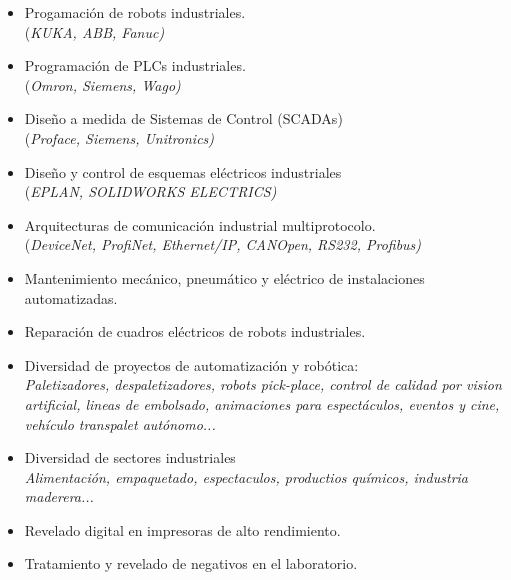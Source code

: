 \documentclass[10pt,a4paper,ragged2e]{altacv}
\begin{document}
\begin{fullwidth}
  \begin{itemize}
    \item Progamación de robots industriales.\\
    (\itshape{KUKA}, \itshape{ABB}, \itshape{Fanuc})
    \item Programación de PLCs industriales.\\
    (\itshape{Omron}, \itshape{Siemens}, \itshape{Wago})
    \item Diseño a medida de Sistemas de Control (SCADAs)\\
    (\itshape{Proface}, \itshape{Siemens}, \itshape{Unitronics})
    \item Diseño y control de esquemas eléctricos industriales\\
    (\itshape{EPLAN}, \itshape{SOLIDWORKS ELECTRICS})
    \item Arquitecturas de comunicación industrial multiprotocolo.\\
    (\itshape{DeviceNet}, \itshape{ProfiNet}, \itshape{Ethernet/IP}, \itshape{CANOpen}, \itshape{RS232}, \itshape{Profibus})
    \item Mantenimiento mecánico, pneumático y eléctrico de instalaciones automatizadas.\\
    \item Reparación de cuadros eléctricos de robots industriales.\\
    \item Diversidad de proyectos de automatización y robótica:\\
    \itshape{\small Paletizadores, despaletizadores, robots pick-place, control de calidad por vision
    artificial, lineas de embolsado, animaciones para espectáculos, eventos y cine,
    vehículo transpalet autónomo...}
    \item Diversidad de sectores industriales\\
    \itshape{\small Alimentación, empaquetado, espectaculos, productios químicos, industria maderera...}
  \end{itemize}
  
  \divider
  
  \begin{itemize}
    \item Revelado digital en impresoras de alto rendimiento.
    \item Tratamiento y revelado de negativos en el laboratorio.
  \end{itemize}
  \divider
  

\end{fullwidth}
\end{document}
